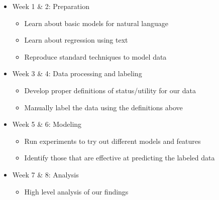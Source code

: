 \documentclass[dvips,12pt]{article}
\begin{document}
\begin{itemize}
	
	\item Week 1 \& 2: Preparation
	\begin{itemize}
		\item Learn about basic models for natural language
		\item Learn about regression using text			
		\item Reproduce standard techniques to model data
	\end{itemize}
	
	\item Week 3 \& 4: Data processing and labeling
	\begin{itemize}
		\item Develop proper definitions of status/utility for our data
		\item Manually label the data using the definitions above
	\end{itemize}
	
	\item Week 5 \& 6: Modeling
	\begin{itemize}
		\item Run experiments to try out different models and features
		\item Identify those that are effective at predicting the labeled data
	\end{itemize}
	
	\item Week 7 \& 8: Analysis
	\begin{itemize}
		\item High level analysis of our findings
	\end{itemize}
\end{itemize}




\begin{thebibliography}{99}


\end{thebibliography}
\end{document}
